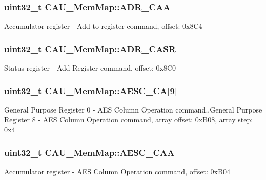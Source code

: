 \subsubsection[{A\+D\+R\+\_\+\+C\+A\+A}]{\setlength{\rightskip}{0pt plus 5cm}uint32\+\_\+t C\+A\+U\+\_\+\+Mem\+Map\+::\+A\+D\+R\+\_\+\+C\+A\+A}\label{struct_c_a_u___mem_map_a453c3f0527c3c433b9c4b47e2e1f5c91}
Accumulator register -\/ Add to register command, offset\+: 0x8\+C4 \hypertarget{struct_c_a_u___mem_map_a064a59c5835525e09b7ce745abf8ba50}{}
\subsubsection[{A\+D\+R\+\_\+\+C\+A\+S\+R}]{\setlength{\rightskip}{0pt plus 5cm}uint32\+\_\+t C\+A\+U\+\_\+\+Mem\+Map\+::\+A\+D\+R\+\_\+\+C\+A\+S\+R}\label{struct_c_a_u___mem_map_a064a59c5835525e09b7ce745abf8ba50}
Status register -\/ Add Register command, offset\+: 0x8\+C0 \hypertarget{struct_c_a_u___mem_map_acf5e684692c0a798b2c1e00266d2d144}{}
\subsubsection[{A\+E\+S\+C\+\_\+\+C\+A}]{\setlength{\rightskip}{0pt plus 5cm}uint32\+\_\+t C\+A\+U\+\_\+\+Mem\+Map\+::\+A\+E\+S\+C\+\_\+\+C\+A\mbox{[}9\mbox{]}}\label{struct_c_a_u___mem_map_acf5e684692c0a798b2c1e00266d2d144}
General Purpose Register 0 -\/ A\+E\+S Column Operation command..General Purpose Register 8 -\/ A\+E\+S Column Operation command, array offset\+: 0x\+B08, array step\+: 0x4 \hypertarget{struct_c_a_u___mem_map_a9275653d76493cec2822698ce68b4786}{}
\subsubsection[{A\+E\+S\+C\+\_\+\+C\+A\+A}]{\setlength{\rightskip}{0pt plus 5cm}uint32\+\_\+t C\+A\+U\+\_\+\+Mem\+Map\+::\+A\+E\+S\+C\+\_\+\+C\+A\+A}\label{struct_c_a_u___mem_map_a9275653d76493cec2822698ce68b4786}
Accumulator register -\/ A\+E\+S Column Operation command, offset\+: 0x\+B04 \hypertarget{struct_c_a_u___mem_map_aef9ec16f001c68f0f8584424c78a8a3c}{}
